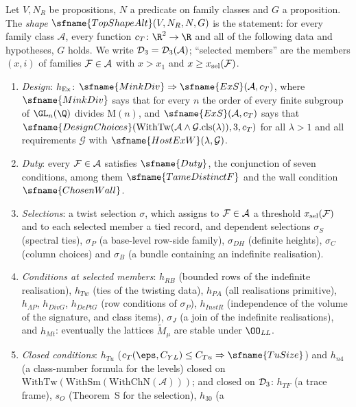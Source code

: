 \begin{definition}\label{pf:top-shape:shape}
Let $V,N_R$ be propositions, $N$ a predicate on family classes and $G$ a proposition. The \emph{shape}
$\sfname{TopShapeAlt}(V,N_R,N,G)$ is the statement: for every family class $\mathcal A$, every function
$c_T\colon\R^2\to\R$ and all of the following data and hypotheses, $G$ holds. We write $\mathcal{D}_3=\mathcal{D}_3(\mathcal A)$;
``selected members'' are the members $(x,i)$ of families $\mathcal{F}\in\mathcal A$ with $x>x_1$ and
$x\ge x_{\rm sel}(\mathcal{F})$.
\begin{enumerate}[label=(\alph*)]
\item \emph{Design}: $h_{\rm Ex}$: $\sfname{MinkDiv}\Rightarrow\sfname{ExS}(\mathcal A,c_T)$, where
$\sfname{MinkDiv}$ says that for every $n$ the order of every finite subgroup of $\GL_n(\Q)$ divides
$\mathrm M(n)$, and $\sfname{ExS}(\mathcal A,c_T)$ says that $\sfname{DesignChoices}(\mathrm{WithTw}(\mathcal
A\wedge\mathcal G.\mathrm{cls}(\lambda)),3,c_T)$ for all $\lambda>1$ and all requirements $\mathcal G$ with
$\sfname{HostExW}(\lambda,\mathcal G)$.
\item \emph{Duty}: every $\mathcal{F}\in\mathcal A$ satisfies $\sfname{Duty}$, the conjunction of seven
conditions, among them $\sfname{TameDistinctF}$ and the wall condition $\sfname{ChosenWall}$.
\item \emph{Selections}: a twist selection $\sigma$, which assigns to $\mathcal{F}\in\mathcal A$ a threshold
$x_{\rm sel}(\mathcal{F})$ and to each selected member a tied record, and dependent selections $\sigma_S$
(spectral ties), $\sigma_P$ (a base-level row-side family), $\sigma_{DH}$ (definite heights), $\sigma_C$
(column choices) and $\sigma_B$ (a bundle containing an indefinite realisation).
\item \emph{Conditions at selected members}: $h_{RB}$ (bounded rows of the indefinite realisation), $h_{Tw}$
(ties of the twisting data), $h_{PA}$ (all realisations primitive), $h_{\Lambda P}$, $h_{DivG}$, $h_{DcPtG}$ (row
conditions of $\sigma_P$), $h_{InstR}$ (independence of the volume of the signature, and class items),
$\sigma_J$ (a join of the indefinite realisations), and $h_{Mt}$: eventually the lattices $\widetilde M_\mu$ are
stable under $\OO_{\mathit{LL}}$.
\item \emph{Closed conditions}: $h_{Tu}$ ($c_T(\eps,C_{YL})\le C_{Tu}\Rightarrow\sfname{TuSize}$) and $h_{n4}$ (a
class-number formula for the levels) closed on $\mathrm{WithTw}(\mathrm{WithSm}(\mathrm{WithChN}(\mathcal
A)))$; and closed on $\mathcal{D}_3$: $h_{TF}$ (a trace frame), $s_O$ (Theorem~S for the selection), $h_{30}$ (a

\end{enumerate}
\end{definition}
